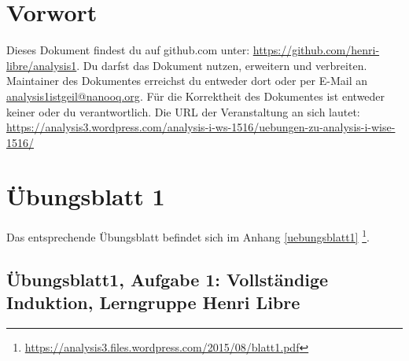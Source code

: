 \documentclass[12pt,a4paper]{report}
\begin{document}
\newcommand \GruppeA {Lerngruppe Henri Libre}

	\tableofcontents
	\newpage
	
	\chapter{Vorwort}
	Dieses Dokument findest du auf github.com unter: \href{https://github.com/henri-libre/analysis1}{https://github.com/henri-libre/analysis1}. Du darfst das Dokument nutzen, erweitern und verbreiten. Maintainer des Dokumentes erreichst du entweder dort oder per E-Mail an \href{analysis1istgeil@nanooq.org}{analysis1istgeil@nanooq.org}. Für die Korrektheit des Dokumentes ist entweder keiner oder du verantwortlich. Die URL der Veranstaltung an sich lautet: \href{https://analysis3.wordpress.com/analysis-i-ws-1516/uebungen-zu-analysis-i-wise-1516/}{https://analysis3.wordpress.com/analysis-i-ws-1516/uebungen-zu-analysis-i-wise-1516/}
	
	\setcounter{chapter}{1}
\chapter*{Übungsblatt 1}
	
	Das entsprechende Übungsblatt befindet sich im Anhang \ref{uebungsblatt1} \footnote{\href{https://analysis3.files.wordpress.com/2015/08/blatt1.pdf}{https://analysis3.files.wordpress.com/2015/08/blatt1.pdf}}.

\newpage		
\section{Übungsblatt1, Aufgabe 1: Vollständige Induktion, \GruppeA}
	
\end{document}
